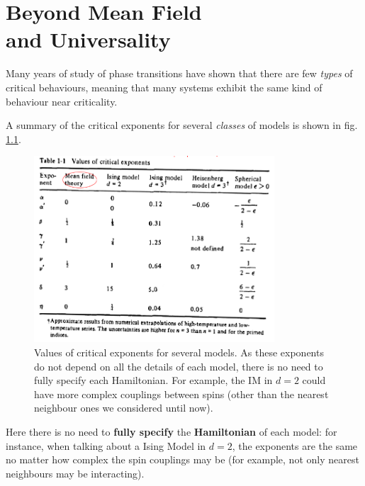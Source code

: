 \documentclass[../../main.tex]{subfiles}
\begin{document}

\chapter{Beyond Mean Field\\ and Universality}
Many years of study of phase transitions have shown that there are few \textit{types} of critical behaviours, meaning that many systems exhibit the same kind of behaviour near criticality.

\medskip

A summary of the critical exponents for several \textit{classes} of models is shown in fig. \ref{fig:table-criticality}. 

\begin{figure}[H]
    \centering
    \includegraphics[width=0.8\textwidth]{table-criticality.png}
    \caption{Values of critical exponents for several models. As these exponents do not depend on all the details of each model, there is no need to fully specify each Hamiltonian. For example, the IM in $d=2$ could have more complex couplings between spins (other than the nearest neighbour ones we considered until now).} %
    \label{fig:table-criticality}
\end{figure}

Here there is no need to \textbf{fully specify} the \textbf{Hamiltonian} of each model: for instance, when talking about a Ising Model in $d=2$, the exponents are the same no matter how complex the spin couplings may be (for example, not only nearest neighbours may be interacting).
\end{document}
